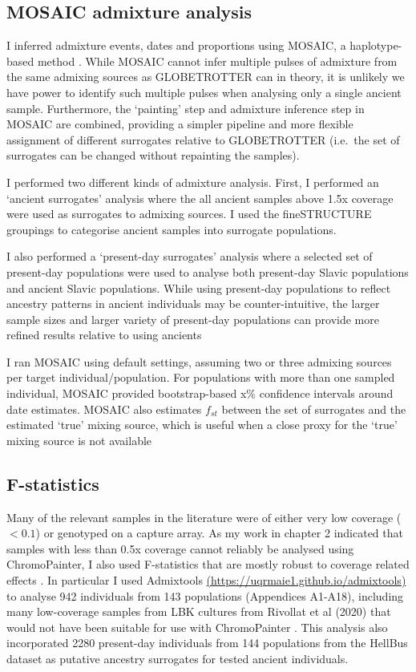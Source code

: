 \subsection{MOSAIC admixture analysis}

I inferred admixture events, dates and proportions using MOSAIC, a haplotype-based method \cite{MOSAIC_2019}. While MOSAIC cannot infer multiple pulses of admixture from the same admixing sources as GLOBETROTTER can in theory, it is unlikely we have power to identify such multiple pulses when analysing only a single ancient sample. Furthermore, the `painting' step and admixture inference step in MOSAIC are combined, providing a simpler pipeline and more flexible assignment of different surrogates relative to GLOBETROTTER (i.e.\ the set of surrogates can be changed without repainting the samples).

I performed two different kinds of admixture analysis. First, I performed an `ancient surrogates' analysis where the all ancient samples above 1.5x coverage were used as surrogates to admixing sources. I used the fineSTRUCTURE groupings to categorise ancient samples into surrogate populations. 

I also performed a `present-day surrogates' analysis where a selected set of present-day populations were used to analyse both present-day Slavic populations and ancient Slavic populations. While using present-day populations to reflect ancestry patterns in ancient individuals may be counter-intuitive, the larger sample sizes and larger variety of present-day populations can provide more refined results relative to using ancients

I ran MOSAIC using default settings, assuming two or three admixing sources per target individual/population. For populations with more than one sampled individual, MOSAIC provided bootstrap-based x\% confidence intervals around date estimates. MOSAIC also estimates $f_{st}$ between the set of surrogates and the estimated `true' mixing source, which is useful when a close proxy for the `true' mixing source is not available

\subsection{F-statistics}

Many of the relevant samples in the literature were of either very low coverage ($<0.1$) or genotyped on a capture array. As my work in chapter 2 indicated that samples with less than 0.5x coverage cannot reliably be analysed using ChromoPainter, I also used F-statistics \cite{Patterson2012} that are mostly robust to coverage related effects \cite{AssessingqpAdm}. In particular I used Admixtools \url{(https://uqrmaie1.github.io/admixtools)} to analyse 942 individuals from 143 populations (Appendices A1-A18), including many low-coverage samples from LBK cultures from Rivollat et al (2020) that would not have been suitable for use with ChromoPainter \cite{rivollat2020france}. This analysis also incorporated 2280 present-day individuals from 144 populations from the HellBus dataset as putative ancestry surrogates for tested ancient individuals. 

